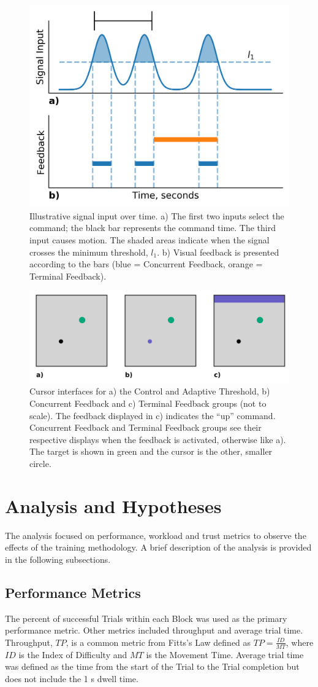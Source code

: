 \begin{figure}[hbt!]
\centering
\includegraphics[height=.4\textwidth]{figures/Figure1}
\caption{\label{figure:label1} Illustrative signal input over time.
a) The first two inputs select the command; the black bar represents the command time.
The third input causes motion.
The shaded areas indicate when the signal crosses the minimum threshold, $l_1$.
b) Visual feedback is presented according to the bars (blue = Concurrent Feedback, orange = Terminal Feedback).}
\end{figure}

\begin{figure}[hbt!]
\centering
\includegraphics[width=.6125\textwidth]{figures/Figure2}
\caption{\label{figure:label2} Cursor interfaces for a) the Control and Adaptive Threshold, b) Concurrent Feedback and c) Terminal Feedback groups (not to scale).
The feedback displayed in c) indicates the ``up'' command.
Concurrent Feedback and Terminal Feedback groups see their respective displays when the feedback is activated, otherwise like a).
The target is shown in green and the cursor is the other, smaller circle.}
\end{figure}

\section{Analysis and Hypotheses}
The analysis focused on performance, workload and trust metrics to observe the effects of the training methodology.
A brief description of the analysis is provided in the following subsections.

\subsection{Performance Metrics}
The percent of successful Trials within each Block was used as the primary performance metric.
Other metrics included throughput and average trial time.
Throughput, $TP$, is a common metric from Fitts's Law defined as $TP = \frac{ID}{MT}$, where $ID$ is the Index of Difficulty and $MT$ is the Movement Time.
Average trial time was defined as the time from the start of the Trial to the Trial completion but does not include the 1 s dwell time.


